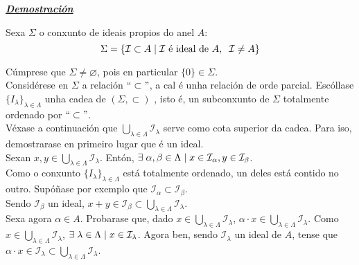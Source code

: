 \documentclass[twoside]{report}
\theoremstyle{mystyle}
\begin{document}
\noindent \textbf{\textit{\underline{Demostración}}}

\vspace{2mm}

\noindent Sexa $\Sigma$ o conxunto de ideais propios do anel $A$:
$$\Sigma = \{ \mathcal{I} \subset A \hspace{1MM} | \hspace{1MM} \mathcal{I} \text{ é ideal de } A, \hspace{2mm} \mathcal{I} \neq A\}$$

\noindent Cúmprese que $\Sigma \neq \varnothing$, pois en particular $\{0\} \in \Sigma$.\\

\noindent Considérese en $\Sigma$ a relación $``\subset"$, a cal é unha relación de orde parcial. Escóllase $\{I_{\lambda}\}_{\lambda \in \Lambda}$ unha cadea de $(\Sigma, \subset)$ , isto é, un subconxunto de $\Sigma$ totalmente ordenado por $`` \subset"$. \\

\noindent Véxase a continuación que $\underset{\lambda \in \Lambda}{\bigcup}\mathcal{I_{\lambda}}$ serve como cota superior da cadea. Para iso, demostrarase en primeiro lugar que é un ideal.\\

\noindent Sexan $x, y \in \underset{\lambda \in \Lambda}{\bigcup}\mathcal{I_{\lambda}}$. Entón, $\exists \hspace{1mm} \alpha, \beta \in \Lambda \hspace{1mm} | \hspace{1mm} x \in \mathcal{I}_{\alpha}, y \in \mathcal{I}_{\beta}$.\\

\noindent Como o conxunto $\{I_{\lambda}\}_{\lambda \in \Lambda}$ está totalmente ordenado, un deles está contido no outro. Supóñase por exemplo que $\mathcal{I}_{\alpha} \subset \mathcal{I}_{\beta}$.\\

\noindent Sendo $\mathcal{I}_{\beta}$ un ideal, $x + y \in \mathcal{I}_{\beta} \subset \underset{\lambda \in \Lambda}{\bigcup}\mathcal{I_{\lambda}}$.\\

\noindent Sexa agora $\alpha \in A$. Probarase que, dado $x \in \underset{\lambda \in \Lambda}{\bigcup}\mathcal{I_{\lambda}}$, $\alpha \cdot x \in \underset{\lambda \in \Lambda}{\bigcup}\mathcal{I_{\lambda}}$. Como $x \in \underset{\lambda \in \Lambda}{\bigcup}\mathcal{I_{\lambda}}$, $\exists \hspace{1mm} \lambda \in \Lambda \hspace{1mm} | \hspace{1mm} x \in \mathcal{I}_{\lambda}$. Agora ben, sendo $\mathcal{I}_{\lambda}$ un ideal de $A$, tense que $\alpha \cdot x \in \mathcal{I}_{\lambda} \subset \underset{\lambda \in \Lambda}{\bigcup}\mathcal{I_{\lambda}}$.\\
\end{document}
